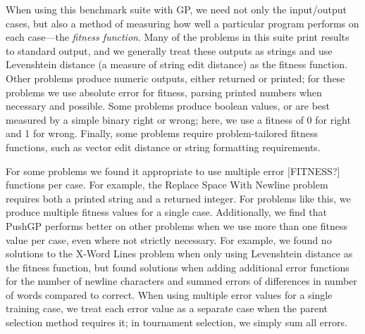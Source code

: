 \documentclass{sig-alternate}
\begin{document}
When using this benchmark suite with GP, we need not only the input/output cases, but also a method of measuring how well a particular program performs on each case---the \textit{fitness function}. 
Many of the problems in this suite print results to standard output, and we generally treat these outputs as strings and use Levenshtein distance (a measure of string edit distance) as the fitness function. Other problems produce numeric outputs, either returned or printed; for these problems we use absolute error for fitness, parsing printed numbers when necessary and possible. Some problems produce boolean values, or are best measured by a simple binary right or wrong; here, we use a fitness of 0 for right and 1 for wrong. Finally, some problems require problem-tailored fitness functions, such as vector edit distance or string formatting requirements.

For some problems we found it appropriate to use multiple error [FITNESS?] functions per case. For example, the Replace Space With Newline problem requires both a printed string and a returned integer. For problems like this, we produce multiple fitness values for a single case. Additionally, we find that PushGP performs better on other problems when we use more than one fitness value per case, even where not strictly necessary. For example, we found no solutions to the X-Word Lines problem when only using Levenshtein distance as the fitness function, but found solutions when adding additional error functions for the number of newline characters and summed errors of differences in number of words compared to correct. When using multiple error values for a single training case, we treat each error value as a separate case when the parent selection method requires it; in tournament selection, we simply sum all errors.
\end{document}
